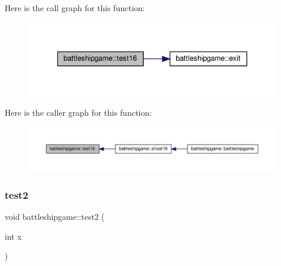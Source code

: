 Here is the call graph for this function\+:
\nopagebreak
\begin{figure}[H]
\begin{center}
\leavevmode
\includegraphics[width=336pt]{classbattleshipgame_a24b68bab1498b0d2841ca1e2127d81c7_cgraph}
\end{center}
\end{figure}
Here is the caller graph for this function\+:
\nopagebreak
\begin{figure}[H]
\begin{center}
\leavevmode
\includegraphics[width=350pt]{classbattleshipgame_a24b68bab1498b0d2841ca1e2127d81c7_icgraph}
\end{center}
\end{figure}
\mbox{\label{classbattleshipgame_a1f6ca1a66e975c0e9785278a2e6d92b9}} 
\subsubsection{\texorpdfstring{test2}{test2}}
{\footnotesize\ttfamily void battleshipgame\+::test2 (\begin{DoxyParamCaption}\item[{int}]{x }\end{DoxyParamCaption})\hspace{0.3cm}{\ttfamily [slot]}}

